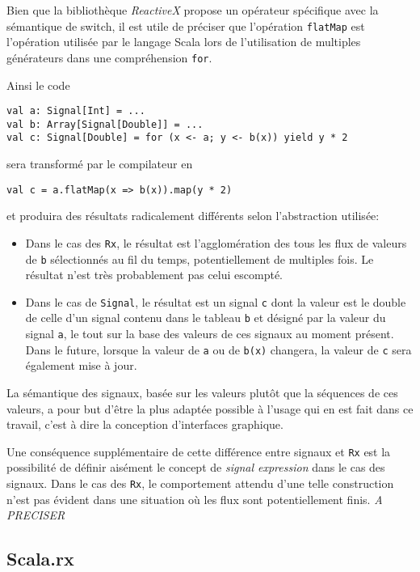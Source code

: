 Bien que la bibliothèque \emph{ReactiveX} propose un opérateur spécifique avec la sémantique de switch, il est utile de préciser que l'opération \texttt{flatMap} est l'opération utilisée par le langage Scala lors de l'utilisation de multiples générateurs dans une compréhension \texttt{for}.

Ainsi le code
\begin{lstlisting}
val a: Signal[Int] = ...
val b: Array[Signal[Double]] = ...
val c: Signal[Double] = for (x <- a; y <- b(x)) yield y * 2
\end{lstlisting}

sera transformé par le compilateur en
\begin{lstlisting}
val c = a.flatMap(x => b(x)).map(y * 2)
\end{lstlisting}

et produira des résultats radicalement différents selon l'abstraction utilisée:

\begin{itemize}
	\item Dans le cas des \texttt{Rx}, le résultat est l'agglomération des tous les flux de valeurs de \texttt{b} sélectionnés au fil du temps, potentiellement de multiples fois. Le résultat n'est très probablement pas celui escompté.
	
	\item Dans le cas de \texttt{Signal}, le résultat est un signal \texttt{c} dont la valeur est le double de celle d'un signal contenu dans le tableau \texttt{b} et désigné par la valeur du signal \texttt{a}, le tout sur la base des valeurs de ces signaux au moment présent. Dans le future, lorsque la valeur de \texttt{a} ou de \texttt{b(x)} changera, la valeur de \texttt{c} sera également mise à jour.
\end{itemize}

La sémantique des signaux, basée sur les valeurs plutôt que la séquences de ces valeurs, a pour but d'être la plus adaptée possible à l'usage qui en est fait dans ce travail, c'est à dire la conception d'interfaces graphique.

Une conséquence supplémentaire de cette différence entre signaux et \texttt{Rx} est la possibilité de définir aisément le concept de \emph{signal expression} dans le cas des signaux. Dans le cas des \texttt{Rx}, le comportement attendu d'une telle construction n'est pas évident dans une situation où les flux sont potentiellement finis. \textit{A PRECISER}

\subsection{Scala.rx}

